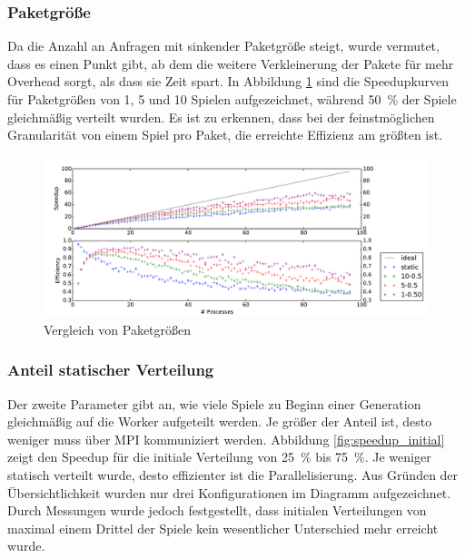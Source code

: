 \subsubsection{Paketgröße}
Da die Anzahl an Anfragen mit sinkender Paketgröße steigt, wurde vermutet, dass
es einen Punkt gibt, ab dem die weitere Verkleinerung der Pakete für mehr
Overhead sorgt, als dass sie Zeit spart.
In Abbildung \ref{fig:speedup_chunksize} sind die Speedupkurven für Paketgrößen
von 1, 5 und 10 Spielen aufgezeichnet, während \SI{50}{\percent} der Spiele
gleichmäßig verteilt wurden. Es ist zu erkennen, dass bei der feinstmöglichen
Granularität von einem Spiel pro Paket, die erreichte Effizienz am größten ist.

\begin{figure}
    \centering
    \includegraphics[width=\textwidth]
        {content/img/strong_scaling_time_chunksize.pdf}
    \caption{Vergleich von Paketgrößen}
    \label{fig:speedup_chunksize}
\end{figure}

\subsubsection{Anteil statischer Verteilung}
Der zweite Parameter gibt an, wie viele Spiele zu Beginn einer Generation
gleichmäßig auf die Worker aufgeteilt werden. Je größer der Anteil ist, desto
weniger muss über MPI kommuniziert werden. Abbildung \ref{fig:speedup_initial}
zeigt den Speedup für die initiale Verteilung von \SI{25}{\percent} bis
\SI{75}{\percent}. Je weniger statisch verteilt wurde, desto effizienter ist
die Parallelisierung. Aus Gründen der Übersichtlichkeit wurden nur drei
Konfigurationen im Diagramm aufgezeichnet. Durch Messungen wurde jedoch
festgestellt, dass initialen Verteilungen von maximal einem Drittel der Spiele
kein wesentlicher Unterschied mehr erreicht wurde.

